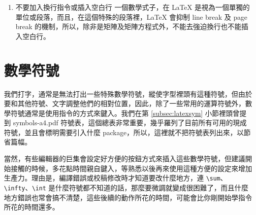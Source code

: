 \begin{enumerate}
        \begin{quote}
          \begin{tabular}{lllllll}
            \verb|\arccos| & \verb|\cos| & \verb|\csc| & \verb|\exp| & \verb|\ker| & \verb|\limsup| & \verb|\min| \\
            \verb|\arcsin| & \verb|\cosh| & \verb|\deg| & \verb|\gcd| & \verb|\lg| & \verb|\ln| & \verb|\Pr| \\
            \verb|\arctan| & \verb|\cot| & \verb|\det| & \verb|\hom| & \verb|\lim| & \verb|\log| & \verb|\sec| \\
            \verb|\arg| & \verb|\coth| & \verb|\dim| & \verb|\inf| & \verb|\liminf| & \verb|\max| & \verb|\sin| \\
            \verb|\sinh| & \verb|\sup| & \verb|\tan| & \verb|\tanh|                                                                               \\
          \end{tabular}
        \end{quote}

        這樣往後只要是函數名就直接在數學模式中使用這些現成的指令就行了。當然，如果是這裡沒有涵蓋的函數名，就得自行加以注意了。

        另外，單位名、化學元素、數字、簡寫縮寫文字等都不使用斜體字。但例外的例外，物理中的常數名則仍然是要使用斜體字，例如光速 \textit{c}。

  \item 不要加入換行指令或插入空白行 \newline
        一個數學式子，在 \LaTeX{} 是視為一個單獨的單位或段落，而且，在這個特殊的段落裡，\LaTeX{} 會抑制 line break 及 page break 的機制，所以，除非是矩陣及矩陣方程式外，不能去強迫換行也不能插入空白行。

\end{enumerate}


\section{數學符號}

我們打字，通常是無法打出一些特殊數學符號，縱使字型裡頭有這種符號，但由於要和其他符號、文字調整他們的相對位置，因此，除了一些常用的運算符號外，數學符號通常是使用指令的方式來鍵入。我們在第 \ref{subsec:latexsym} 小節裡頭曾提到 {\ttfamily symbols-a4.pdf} 符號表，這個總表非常重要，幾乎羅列了目前所有可用的現成符號，並且會標明需要引入什麼 package，所以，這裡就不把符號表列出來，以節省篇幅。

當然，有些編輯器的巨集會設定好方便的按鈕方式來插入這些數學符號，但建議開始接觸的時候，多花點時間親自鍵入，等熟悉以後再來使用這種方便的設定來增加生產力。理由是，編譯錯誤或校稿修改時才知道要改什麼地方，連 \verb|\sum|、\verb|\infty|、\verb|\int| 是什麼符號都不知道的話，那麼要微調就變成很困難了，而且什麼地方錯誤也常會搞不清楚，這些後續的動作所花的時間，可能會比你剛開始學指令所花的時間還多。


